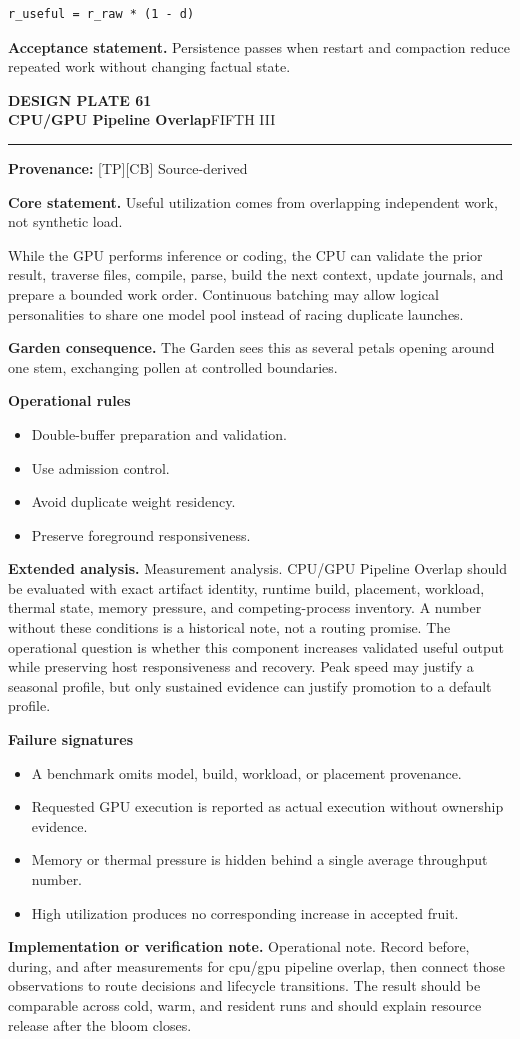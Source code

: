 \documentclass[10pt,letterpaper,oneside]{article}
\newcommand{\prov}[1]{\textcolor{gardenBlue}{\sffamily\footnotesize\textbf{Provenance:} #1}}
\newcommand{\platetitle}[3]{%
  \begin{minipage}[t][0.54in][t]{\textwidth}
  {\sffamily\bfseries\color{gardenDeep}\fontsize{9}{10}\selectfont DESIGN PLATE #1}\\[-1pt]
  {\sffamily\bfseries\color{gardenInk}\fontsize{16.5}{18}\selectfont #2}\hfill{\sffamily\color{gardenGreen}\large #3}
  \end{minipage}\vspace{-2pt}\hrule\vspace{5pt}}
\begin{document}
\begin{lstlisting}
r_useful = r_raw * (1 - d)
\end{lstlisting}
\begin{acceptbox}
\textbf{Acceptance statement.} Persistence passes when restart and compaction reduce repeated work without changing factual state.
\end{acceptbox}
\newpage
\platetitle{61}{CPU/GPU Pipeline Overlap}{FIFTH III}
\prov{[TP][CB] Source-derived}
\fontsize{8.85}{10.45}\selectfont
\begin{corebox}
\textbf{Core statement.} Useful utilization comes from overlapping independent work, not synthetic load.
\end{corebox}
While the GPU performs inference or coding, the CPU can validate the prior result, traverse files, compile, parse, build the next context, update journals, and prepare a bounded work order. Continuous batching may allow logical personalities to share one model pool instead of racing duplicate launches.

\textbf{Garden consequence.} The Garden sees this as several petals opening around one stem, exchanging pollen at controlled boundaries.

\textbf{Operational rules}
\begin{itemize}
\item Double-buffer preparation and validation.
\item Use admission control.
\item Avoid duplicate weight residency.
\item Preserve foreground responsiveness.
\end{itemize}
\textbf{Extended analysis.} Measurement analysis. CPU/GPU Pipeline Overlap should be evaluated with exact artifact identity, runtime build, placement, workload, thermal state, memory pressure, and competing-process inventory. A number without these conditions is a historical note, not a routing promise. The operational question is whether this component increases validated useful output while preserving host responsiveness and recovery. Peak speed may justify a seasonal profile, but only sustained evidence can justify promotion to a default profile.

\textbf{Failure signatures}
\begin{itemize}
\item A benchmark omits model, build, workload, or placement provenance.
\item Requested GPU execution is reported as actual execution without ownership evidence.
\item Memory or thermal pressure is hidden behind a single average throughput number.
\item High utilization produces no corresponding increase in accepted fruit.
\end{itemize}
\textbf{Implementation or verification note.} Operational note. Record before, during, and after measurements for cpu/gpu pipeline overlap, then connect those observations to route decisions and lifecycle transitions. The result should be comparable across cold, warm, and resident runs and should explain resource release after the bloom closes.
\end{document}
